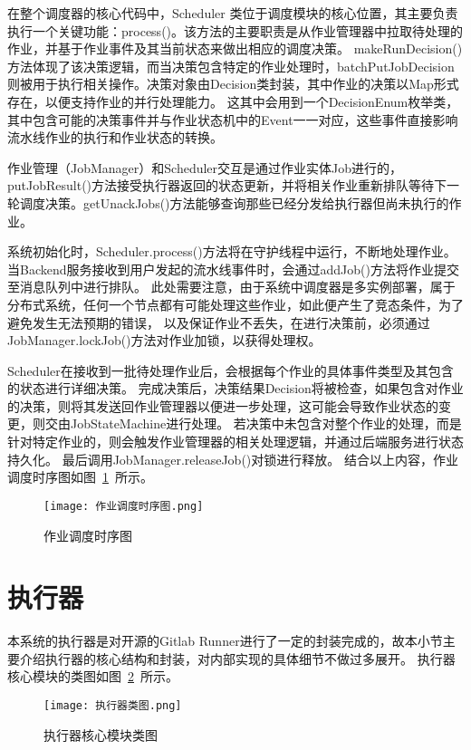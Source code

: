 在整个调度器的核心代码中，Scheduler 类位于调度模块的核心位置，其主要负责执行一个关键功能：process()。该方法的主要职责是从作业管理器中拉取待处理的作业，并基于作业事件及其当前状态来做出相应的调度决策。
makeRunDecision()方法体现了该决策逻辑，而当决策包含特定的作业处理时，batchPutJobDecision则被用于执行相关操作。决策对象由Decision类封装，其中作业的决策以Map形式存在，以便支持作业的并行处理能力。
这其中会用到一个DecisionEnum枚举类，其中包含可能的决策事件并与作业状态机中的Event一一对应，这些事件直接影响流水线作业的执行和作业状态的转换。

作业管理（JobManager）和Scheduler交互是通过作业实体Job进行的，putJobResult()方法接受执行器返回的状态更新，并将相关作业重新排队等待下一轮调度决策。getUnackJobs()方法能够查询那些已经分发给执行器但尚未执行的作业。

系统初始化时，Scheduler.process()方法将在守护线程中运行，不断地处理作业。当Backend服务接收到用户发起的流水线事件时，会通过addJob()方法将作业提交至消息队列中进行排队。
此处需要注意，由于系统中调度器是多实例部署，属于分布式系统，任何一个节点都有可能处理这些作业，如此便产生了竞态条件，为了避免发生无法预期的错误，
以及保证作业不丢失，在进行决策前，必须通过JobManager.lockJob()方法对作业加锁，以获得处理权。

Scheduler在接收到一批待处理作业后，会根据每个作业的具体事件类型及其包含的状态进行详细决策。
完成决策后，决策结果Decision将被检查，如果包含对作业的决策，则将其发送回作业管理器以便进一步处理，这可能会导致作业状态的变更，则交由JobStateMachine进行处理。
若决策中未包含对整个作业的处理，而是针对特定作业的，则会触发作业管理器的相关处理逻辑，并通过后端服务进行状态持久化。
最后调用JobManager.releaseJob()对锁进行释放。
结合以上内容，作业调度时序图如图~\ref{fig:作业调度时序图}~所示。

\begin{figure}[h]
  \centering
  \texttt{[image: 作业调度时序图.png]}
  \caption{作业调度时序图}
  \label{fig:作业调度时序图}
\end{figure}

\section{执行器}

本系统的执行器是对开源的Gitlab Runner进行了一定的封装完成的，故本小节主要介绍执行器的核心结构和封装，对内部实现的具体细节不做过多展开。
执行器核心模块的类图如图~\ref{fig:执行器核心模块类图}~所示。

\begin{figure}[h]
  \centering
  \texttt{[image: 执行器类图.png]}
  \caption{执行器核心模块类图}
  \label{fig:执行器核心模块类图}
\end{figure}

